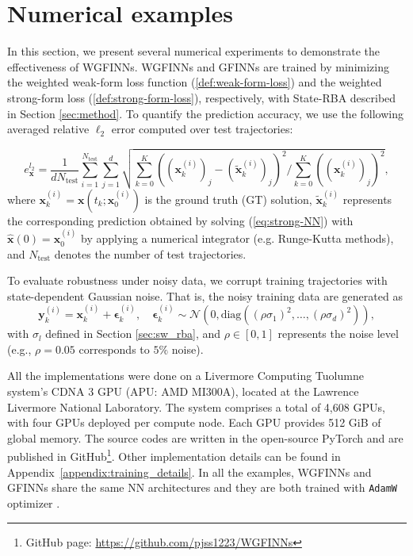 \documentclass[final]{siamltex}
\newcommand{\bfa}[1]{\boldsymbol{#1}}
\begin{document}
\section{Numerical examples}
\label{sec:results}

In this section, we present several numerical experiments to demonstrate the effectiveness of WGFINNs. 
WGFINNs and GFINNs are trained by minimizing the weighted weak-form loss function (\ref{def:weak-form-loss}) and the weighted strong-form loss (\ref{def:strong-form-loss}), respectively, with State-RBA described in Section \ref{sec:method}. To quantify the prediction accuracy, we use the following averaged relative $\ell_2$ error computed over test trajectories: 


\begin{equation}
\label{eq:test_rmse}
e_{\bfa{x}}^{l_2}
= \frac{1}{d N_{\mathrm{test}}}
\sum_{i=1}^{N_{\mathrm{test}}}
\sum_{j=1}^{d}
\sqrt{
\sum_{k=0}^{K} \left(\left(\bfa{x}_{k}^{(i)}\right)_j- \left(\widetilde{\bfa{x}}_{k}^{(i)}\right)_j\right)^{2}
\Big/ 
\sum_{k=0}^{K} \left(\left(\bfa{x}_{k}^{(i)}\right)_j\right)^{2}
},
\end{equation}
where $\bfa{x}_k^{(i)} = \bfa{x}(t_k;\bfa{x}_0^{(i)})$ is the ground truth (GT) solution, $\widetilde{\bfa{x}}_k^{(i)}$ represents the corresponding prediction obtained by solving (\ref{eq:strong-NN}) with $\widehat{\bfa{x}}(0) = \bfa{x}_0^{(i)}$ by applying a numerical integrator (e.g. Runge-Kutta methods), and $N_{\text{test}}$ denotes the number of test trajectories. 

To evaluate robustness under noisy data, we corrupt training trajectories with state-dependent Gaussian noise. That is, the noisy training data are generated as
$$\bfa{y}_k^{(i)} = \bfa{x}_k^{(i)} + \bfa{\epsilon}_k^{(i)}, \quad \bfa{\epsilon}_k^{(i)} \sim \mathcal{N}(0, \text{diag}((\rho\sigma_1)^2, \ldots, (\rho\sigma_d)^2)),$$
with $\sigma_l$ defined in Section \ref{sec:sw_rba}, and $\rho \in [0,1]$ represents the noise level (e.g., $\rho = 0.05$ corresponds to $5\%$ noise).

All the implementations were done on a Livermore Computing Tuolumne system's CDNA 3 GPU (APU: AMD MI300A), located at the Lawrence Livermore National Laboratory. The system comprises a total of 4,608 GPUs, with four GPUs deployed per compute node. Each GPU provides 512 GiB of global memory.
The source codes are written in the open-source PyTorch \cite{paszke2019pytorch} and are published in GitHub\footnote{GitHub page: \url{https://github.com/pjss1223/WGFINNs}}.
Other implementation details can be found in Appendix~\ref{appendix:training_details}. 
In all the examples, WGFINNs and GFINNs share the same NN architectures and they are both trained with \texttt{AdamW} optimizer \cite{loshchilov2017decoupled}.
\end{document}

